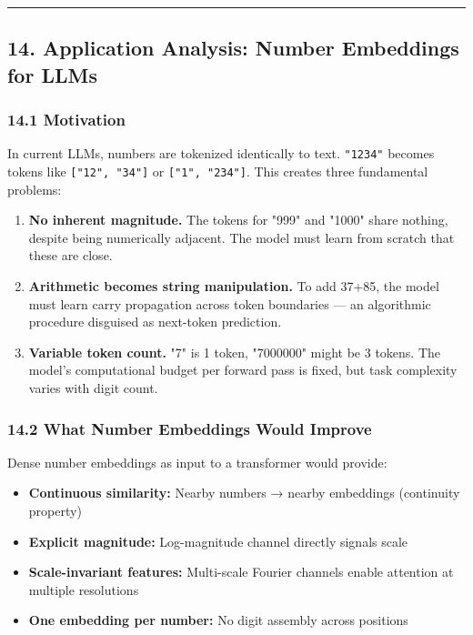 \documentclass[11pt]{article}
\begin{document}
\noindent\rule{\textwidth}{0.4pt}


\subsection*{14. Application Analysis: Number Embeddings for LLMs}


\subsubsection*{14.1 Motivation}


In current LLMs, numbers are tokenized identically to text. \texttt{"1234"} becomes tokens like \texttt{["12", "34"]} or \texttt{["1", "234"]}. This creates three fundamental problems:


\begin{enumerate}
\item \textbf{No inherent magnitude.} The tokens for "999" and "1000" share nothing, despite being numerically adjacent. The model must learn from scratch that these are close.
\item \textbf{Arithmetic becomes string manipulation.} To add 37+85, the model must learn carry propagation across token boundaries — an algorithmic procedure disguised as next-token prediction.
\item \textbf{Variable token count.} "7" is 1 token, "7000000" might be 3 tokens. The model's computational budget per forward pass is fixed, but task complexity varies with digit count.
\end{enumerate}


\subsubsection*{14.2 What Number Embeddings Would Improve}


Dense number embeddings as input to a transformer would provide:


\begin{itemize}
\item \textbf{Continuous similarity:} Nearby numbers → nearby embeddings (continuity property)
\item \textbf{Explicit magnitude:} Log-magnitude channel directly signals scale
\item \textbf{Scale-invariant features:} Multi-scale Fourier channels enable attention at multiple resolutions
\item \textbf{One embedding per number:} No digit assembly across positions
\end{itemize}
\end{document}
